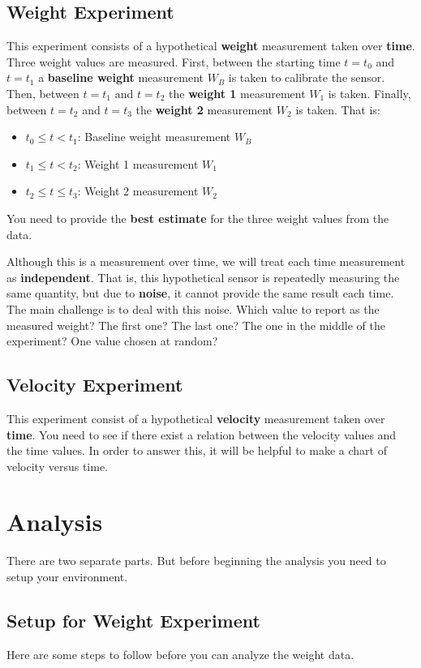 \subsection{Weight Experiment}
%
This experiment consists of a hypothetical \textbf{weight} measurement taken over \textbf{time}. Three weight values are measured. First, between the starting time $t = t_{0}$ and $t = t_{1}$ a \textbf{baseline weight} measurement $W_{B}$ is taken to calibrate the sensor. Then, between $t = t_{1}$ and $t = t_{2}$ the \textbf{weight 1} measurement $W_{1}$ is taken. Finally, between $t = t_{2}$ and $t = t_{3}$ the \textbf{weight 2} measurement $W_{2}$ is taken. That is:
\begin{itemize}
    \item $t_{0} \leq t < t_{1}$: Baseline weight measurement $W_{B}$
    \item $t_{1} \leq t < t_{2}$: Weight 1 measurement $W_{1}$
    \item $t_{2} \leq t \leq t_{3}$: Weight 2 measurement $W_{2}$
\end{itemize}
You need to provide the \textbf{best estimate} for the three weight values from the data.

Although this is a measurement over time, we will treat each time measurement as \textbf{independent}. That is, this hypothetical sensor is repeatedly measuring the same quantity, but due to \textbf{noise}, it cannot provide the same result each time. The main challenge is to deal with this noise. Which value to report as the measured weight? The first one? The last one? The one in the middle of the experiment? One value chosen at random?
%
\subsection{Velocity Experiment}
%
This experiment consist of a hypothetical \textbf{velocity} measurement taken over \textbf{time}. You need to see if there exist a relation between the velocity values and the time values. In order to answer this, it will be helpful to make a chart of velocity versus time.
%
\section{Analysis}
%
There are two separate parts. But before beginning the analysis you need to setup your environment.
%
\subsection{Setup for Weight Experiment}
%
Here are some steps to follow before you can analyze the weight data.
%
